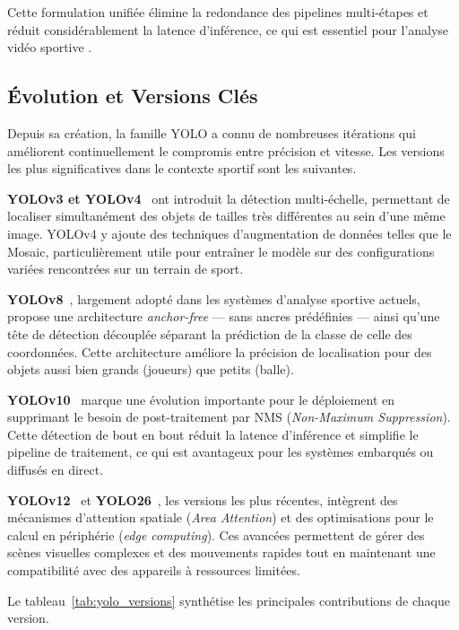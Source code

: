 \begin{itemize}
Cette formulation unifiée élimine la redondance des pipelines multi-étapes et
réduit considérablement la latence d'inférence, ce qui est essentiel pour
l'analyse vidéo sportive .

\subsection{Évolution et Versions Clés}

Depuis sa création, la famille YOLO a connu de nombreuses itérations qui
améliorent continuellement le compromis entre précision et vitesse. Les versions
les plus significatives dans le contexte sportif sont les suivantes.

\textbf{YOLOv3 et YOLOv4}~\cite{yolo_v3,yolo_v4} ont introduit la détection multi-échelle, permettant de
localiser simultanément des objets de tailles très différentes au sein d'une même
image. YOLOv4 y ajoute des techniques d'augmentation de données telles que le
Mosaic, particulièrement utile pour entraîner le modèle sur des configurations
variées rencontrées sur un terrain de sport.

\textbf{YOLOv8}~\cite{yolo_v8}, largement adopté dans les systèmes d'analyse sportive actuels,
propose une architecture \textit{anchor-free} — sans ancres prédéfinies — ainsi
qu'une tête de détection découplée séparant la prédiction de la classe de celle des
coordonnées. Cette architecture améliore la précision de localisation pour des
objets aussi bien grands (joueurs) que petits (balle).

\textbf{YOLOv10}~\cite{yolo_v10} marque une évolution importante pour le déploiement en
supprimant le besoin de post-traitement par NMS
(\textit{Non-Maximum Suppression}). Cette détection de bout en bout réduit la
latence d'inférence et simplifie le pipeline de traitement, ce qui est avantageux
pour les systèmes embarqués ou diffusés en direct.

\textbf{YOLOv12}~\cite{yolo_v12} et \textbf{YOLO26}~\cite{yolo_v26}, les versions les plus récentes, intègrent des
mécanismes d'attention spatiale (\textit{Area Attention}) et des optimisations pour
le calcul en périphérie (\textit{edge computing}). Ces avancées permettent de gérer
des scènes visuelles complexes et des mouvements rapides tout en maintenant une
compatibilité avec des appareils à ressources limitées.

Le tableau~\ref{tab:yolo_versions} synthétise les principales contributions de
chaque version.


\end{itemize}
